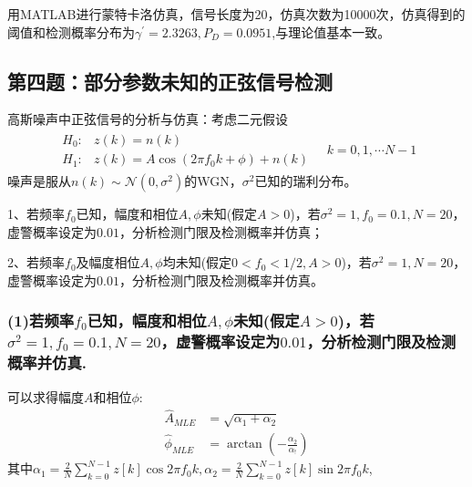 \documentclass[fontset=windows]{article}
\numberwithin{figure}{section}
\begin{document}
用MATLAB进行蒙特卡洛仿真，信号长度为20，仿真次数为10000次，仿真得到的阈值和检测概率分布为\(\gamma^{\prime}=2.3263,P_D=0.0951\),与理论值基本一致。

\subsection{第四题：部分参数未知的正弦信号检测}

高斯噪声中正弦信号的分析与仿真：考虑二元假设
\begin{align*}
	\begin{matrix}
		H_0: & z(k)=n(k)                        \\
		H_1: & z(k)=A\cos(2\pi f_0 k+\phi)+n(k)
	\end{matrix}\quad k=0,1,\cdots N-1
\end{align*}
噪声是服从\(n(k)\sim \mathcal{N}(0,\sigma^2)\)的WGN，\(\sigma^2\)已知的瑞利分布。

1、若频率\(f_0\)已知，幅度和相位\(A,\phi\)未知(假定\(A>0\))，若\(\sigma^2=1,f_0=0.1,N=20\)，虚警概率设定为\(0.01\)，分析检测门限及检测概率并仿真；

2、若频率\(f_0\)及幅度相位\(A,\phi \)均未知(假定\(0<f_0<1/2,A>0\))，若\(\sigma^2=1,N=20\)，虚警概率设定为\(0.01\)，分析检测门限及检测概率并仿真。

\subsubsection*{(1)若频率\(f_0\)已知，幅度和相位\(A,\phi\)未知(假定\(A>0\))，若\(\sigma^2=1,f_0=0.1,N=20\)，虚警概率设定为\(0.01\)，分析检测门限及检测概率并仿真.}

可以求得幅度\(A\)和相位\(\phi\):
\begin{align*}
	\hat{A}_{MLE}    & =\sqrt{\alpha_1+\alpha_2}            \\
	\hat{\phi}_{MLE} & =\arctan(-\frac{\alpha_2}{\alpha_!})
\end{align*}
其中\(\alpha_1=\frac{2}{N}\sum_{k=0}^{N-1}z[k]\cos 2\pi f_0 k,\alpha_2=\frac{2}{N}\sum_{k=0}^{N-1}z[k]\sin 2\pi f_0 k\),
\end{document}
